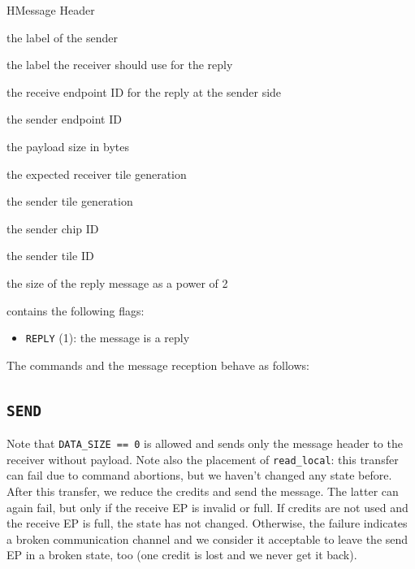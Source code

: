 \begin{register}{H}{Message Header}{}
  \regnewline%
  \regnewline%
  \regnewline%
  \regnewline%
  \begin{regdesc}\begin{reglist}
    \item[label] the label of the sender
    \item[rlabel] the label the receiver should use for the reply
    \item[rep] the receive endpoint ID for the reply at the sender side
    \item[sep] the sender endpoint ID
    \item[length] the payload size in bytes
    \item[rgen] the expected receiver tile generation
    \item[sgen] the sender tile generation
    \item[schip] the sender chip ID
    \item[stile] the sender tile ID
    \item[rsize] the size of the reply message as a power of 2
    \item[flags] contains the following flags:
    \begin{itemize}
      \item \texttt{REPLY} (1): the message is a reply
    \end{itemize}
  \end{reglist}\end{regdesc}
\end{register}

\noindent The commands and the message reception behave as follows:

\subsection{\texttt{SEND}}

Note that \texttt{DATA\_SIZE == 0} is allowed and sends only the message header to the receiver
without payload. Note also the placement of \texttt{read\_local}: this transfer can fail due to
command abortions, but we haven't changed any state before. After this transfer, we reduce the
credits and send the message. The latter can again fail, but only if the receive EP is invalid or
full. If credits are not used and the receive EP is full, the state has not changed. Otherwise, the
failure indicates a broken communication channel and we consider it acceptable to leave the send EP
in a broken state, too (one credit is lost and we never get it back).

